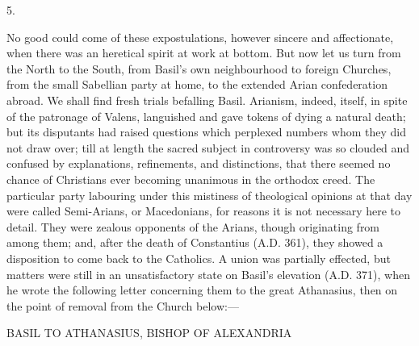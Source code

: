 5.

No good could come of these expostulations, however sincere and
affectionate, when there was an heretical spirit at work at bottom.
But now let us turn from the North to the South, from Basil's own
neighbourhood to foreign Churches, from the small Sabellian party at
home, to the extended Arian confederation abroad. We shall find fresh
trials befalling Basil. Arianism, indeed, itself, in spite of the
patronage of Valens, languished and gave tokens of dying a natural
death; but its disputants had raised questions which perplexed numbers
whom they did not draw over; till at length the sacred subject in
controversy was so clouded and confused by explanations, refinements,
and distinctions, that there seemed no chance of Christians ever
becoming unanimous in the orthodox creed. The particular party
labouring under this mistiness of theological opinions at that
day were called Semi-Arians, or Macedonians, for reasons it is not
necessary here to detail. They were zealous opponents of the Arians,
though originating from among them; and, after the death of
Constantius (A.D. 361), they showed a
disposition to come back to the Catholics. A union was partially
effected, but matters were still in an unsatisfactory state on Basil's
elevation (A.D. 371), when he wrote the
following letter concerning them to the great Athanasius, then on the
point of removal from the Church below:—

BASIL TO ATHANASIUS, BISHOP OF ALEXANDRIA

